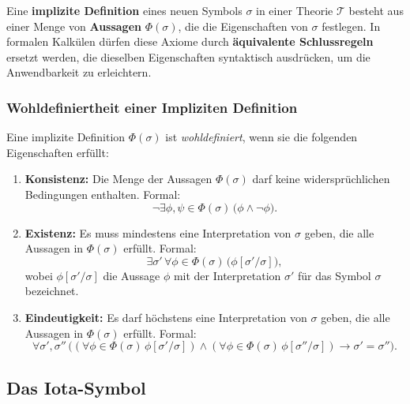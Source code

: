 \documentclass[main.tex]{subfiles}
\begin{document}
\begin{definition}
Eine \textbf{implizite Definition} eines neuen Symbols \(\sigma\) in einer Theorie \(\mathcal{T}\) besteht aus einer Menge von \textbf{Aussagen} \(\Phi(\sigma)\), die die Eigenschaften von \(\sigma\) festlegen.
In formalen Kalkülen dürfen diese Axiome durch \textbf{äquivalente Schlussregeln} ersetzt werden, die dieselben Eigenschaften syntaktisch ausdrücken, um die Anwendbarkeit zu erleichtern.

\end{definition}

\subsubsection{Wohldefiniertheit einer Impliziten Definition}

\begin{definition}
Eine implizite Definition \(\Phi(\sigma)\) ist \emph{wohldefiniert}, wenn sie die folgenden Eigenschaften erfüllt:
\begin{enumerate}
    \item \textbf{Konsistenz:} Die Menge der Aussagen \(\Phi(\sigma)\) darf keine widersprüchlichen Bedingungen enthalten. Formal:
    \[
    \neg \exists \phi, \psi \in \Phi(\sigma) \, \bigl( \phi \land \neg \phi \bigr).
    \]

    \item \textbf{Existenz:} Es muss mindestens eine Interpretation von \(\sigma\) geben, die alle Aussagen in \(\Phi(\sigma)\) erfüllt. Formal:
    \[
    \exists \sigma' \, \forall \phi \in \Phi(\sigma) \, \bigl( \phi[\sigma' / \sigma] \bigr),
    \]
    wobei \(\phi[\sigma' / \sigma]\) die Aussage \(\phi\) mit der Interpretation \(\sigma'\) für das Symbol \(\sigma\) bezeichnet.

    \item \textbf{Eindeutigkeit:} Es darf höchstens eine Interpretation von \(\sigma\) geben, die alle Aussagen in \(\Phi(\sigma)\) erfüllt. Formal:
    \[
    \forall \sigma', \sigma'' \, \bigl( (\forall \phi \in \Phi(\sigma) \, \phi[\sigma' / \sigma]) \land (\forall \phi \in \Phi(\sigma) \, \phi[\sigma'' / \sigma]) \rightarrow \sigma' = \sigma'' \bigr).
    \]
\end{enumerate}
\end{definition}

\subsection{Das Iota-Symbol}
\end{document}
